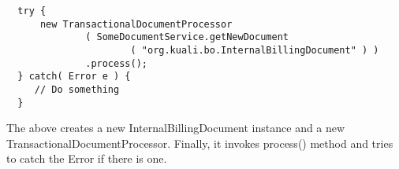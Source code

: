 \documentclass[12pt]{article}
\begin{document}
  \sf \begin{verbatim}
  try {
      new TransactionalDocumentProcessor
              ( SomeDocumentService.getNewDocument
                      ( "org.kuali.bo.InternalBillingDocument" ) )
              .process();
  } catch( Error e ) {
     // Do something 
  }
  \end{verbatim} \rm

  The above creates a new \sf InternalBillingDocument \rm instance and a 
new \sf TransactionalDocumentProcessor\rm. Finally, it invokes \sf process() \rm
method and tries to catch the \sf Error \rm if there is one.
\end{document}
